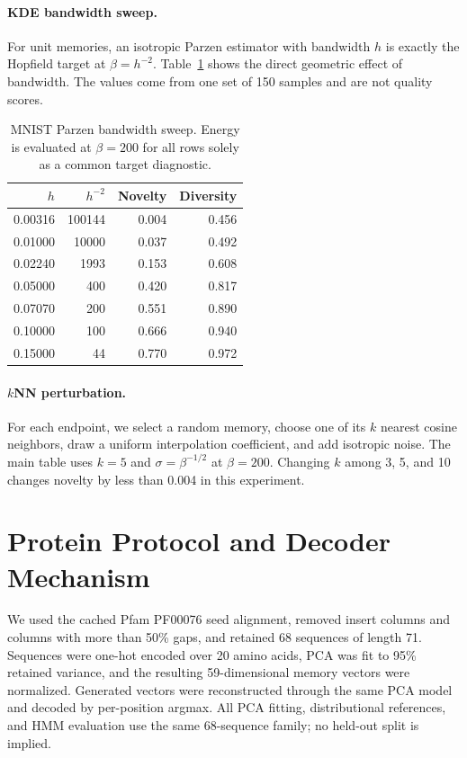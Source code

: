 \paragraph{KDE bandwidth sweep.}
For unit memories, an isotropic Parzen estimator with bandwidth $h$ is exactly
the Hopfield target at $\beta=h^{-2}$. Table~\ref{tab:kde-sweep} shows the direct
geometric effect of bandwidth. The values come from one set of 150 samples and
are not quality scores.

\begin{table}[ht]
\centering
\caption{MNIST Parzen bandwidth sweep. Energy is evaluated at $\beta=200$ for
all rows solely as a common target diagnostic.}
\label{tab:kde-sweep}
\small
\begin{tabular}{@{}rrrr@{}}
\toprule
$h$ & $h^{-2}$ & Novelty & Diversity \\
\midrule
0.00316 & 100144 & 0.004 & 0.456 \\
0.01000 & 10000  & 0.037 & 0.492 \\
0.02240 & 1993   & 0.153 & 0.608 \\
0.05000 & 400    & 0.420 & 0.817 \\
0.07070 & 200    & 0.551 & 0.890 \\
0.10000 & 100    & 0.666 & 0.940 \\
0.15000 & 44     & 0.770 & 0.972 \\
\bottomrule
\end{tabular}
\end{table}

\paragraph{$k$NN perturbation.}
For each endpoint, we select a random memory, choose one of its $k$ nearest
cosine neighbors, draw a uniform interpolation coefficient, and add isotropic
noise. The main table uses $k=5$ and $\sigma=\beta^{-1/2}$ at $\beta=200$.
Changing $k$ among 3, 5, and 10 changes novelty by less than 0.004 in this
experiment.

\section{Protein Protocol and Decoder Mechanism}
\label{app:protein-protocol}

We used the cached Pfam PF00076 seed alignment, removed insert columns and
columns with more than 50\% gaps, and retained 68 sequences of length 71.
Sequences were one-hot encoded over 20 amino acids, PCA was fit to 95\% retained
variance, and the resulting 59-dimensional memory vectors were normalized.
Generated vectors were reconstructed through the same PCA model and decoded by
per-position argmax. All PCA fitting, distributional references, and HMM
evaluation use the same 68-sequence family; no held-out split is implied.

